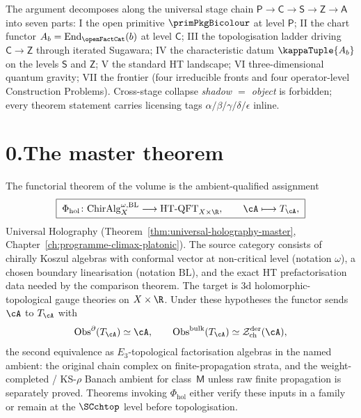 \smallskip\noindent
The argument decomposes along the universal stage chain
$\mathsf{P} \to \mathsf{C} \to \mathsf{S} \to \mathsf{Z} \to \mathsf{A}$
into seven parts: I the open primitive
$\primPkgBicolour$ at level $\mathsf{P}$; II the chart functor
$A_b = \mathrm{End}_{\openFactCat}(b)$ at level $\mathsf{C}$;
III the topologisation ladder driving $\mathsf{C} \to \mathsf{Z}$
through iterated Sugawara; IV the characteristic datum
$\kappaTuple{A_b}$ on the levels $\mathsf{S}$ and $\mathsf{Z}$;
V the standard HT landscape; VI three-dimensional quantum gravity;
VII the frontier (four irreducible fronts and four operator-level
Construction Problems). Cross-stage collapse \emph{shadow $=$ object}
is forbidden; every theorem statement carries licensing tags
$\alpha / \beta / \gamma / \delta / \epsilon$ inline.

\section*{0.\quad The master theorem}

\noindent
The functorial theorem of the volume is the ambient-qualified
assignment
\[
 \boxed{\;
 \Phi_{\mathrm{hol}}\colon
 \mathrm{ChirAlg}^{\omega,\mathrm{BL}}_{X}
 \longrightarrow
 \mathrm{HT\text{-}QFT}_{X \times \R},
 \qquad
 \cA \longmapsto T_\cA,
 \;}
\]
Universal Holography
(Theorem~\ref{thm:universal-holography-master},
Chapter~\ref{ch:programme-climax-platonic}).
The source category consists of chirally Koszul algebras with
conformal vector at non-critical level (notation $\omega$), a chosen
boundary linearisation (notation $\mathrm{BL}$), and the exact HT
prefactorisation data needed by the comparison theorem. The target is
3d holomorphic-topological gauge theories on $X \times \R$. Under
these hypotheses the functor sends $\cA$ to $T_\cA$ with
\[
 \mathrm{Obs}^\partial(T_\cA) \simeq \cA,
 \qquad
 \mathrm{Obs}^{\mathrm{bulk}}(T_\cA) \simeq
 \cZ^{\mathrm{der}}_{\mathrm{ch}}(\cA),
\]
the second equivalence as $E_3$-topological factorisation
algebras in the named ambient: the original chain complex on
finite-propagation strata, and the weight-completed / KS-$\rho$
Banach ambient for class~$\mathsf M$ unless raw finite propagation is
separately proved. Theorems invoking $\Phi_{\mathrm{hol}}$ either
verify these inputs in a family or remain at the $\SCchtop$ level
before topologisation.

